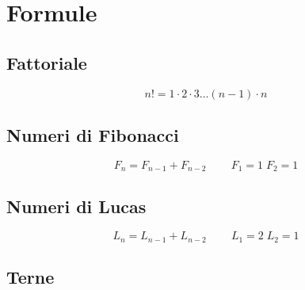 \chapter{Formule}
\section{Fattoriale}
\begin{equation}
n!=1\cdot 2\cdot 3\dots (n-1)\cdot n
\end{equation}
\section{Numeri di Fibonacci}
\begin{equation}
F_n=F_{n-1}+F_{n-2}\qquad\ F_{1}=1\; F_{2}=1 
\end{equation}
\section{Numeri di Lucas}
\begin{equation}
L_n=L_{n-1}+L_{n-2}\qquad\ L_{1}=2\; L_{2}=1 
\end{equation}
\section{Terne}
